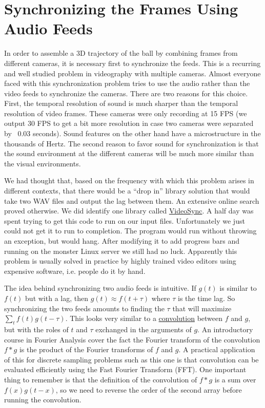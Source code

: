 \documentclass{article}
\begin{document}
\section{Synchronizing the Frames Using Audio Feeds}
In order to assemble a 3D trajectory of the ball by combining frames from different cameras,
it is necessary first to synchronize the feeds.  
This is a recurring and well studied problem in videography with multiple cameras.
Almost everyone faced with this synchronization problem tries to use the audio 
rather than the video feeds to synchronize the cameras.  There are two reasons for this choice.
First, the temporal resolution of sound is much sharper than the temporal resolution of video frames.
These cameras were only recording at 15 FPS 
(we output 30 FPS to get a bit more resolution in case two cameras were separated by ~0.03 seconds).
Sound features on the other hand have a microstructure in the thousands of Hertz.
The second reason to favor sound for synchronization is that the sound environment at the
different cameras will be much more similar than the visual environments.

We had thought that, based on the frequency with which this problem arises in different contexts,
that there would be a ``drop in'' library solution that would take two WAV files and output the lag
between them.  An extensive online search proved otherwise.  
We did identify one library called \href{https://github.com/allisonnicoledeal/VideoSync}{VideoSync}.
A half day was spent trying to get this code to run on our input files.
Unfortunately we just could not get it to run to completion.  
The program would run without throwing an exception, but would hang.
After modifying it to add progress bars and running on the monster Linux server we still had no luck.
Apparently this problem is usually solved in practice by highly trained video editors 
using expensive software, i.e. people do it by hand.

The idea behind synchronizing two audio feeds is intuitive.
If $g(t)$ is similar to $f(t)$ but with a lag, then $g(t) \approx f(t + \tau)$
where $\tau$ is the time lag.  So synchronizing the two feeds amounts to finding the $\tau$ that 
will maximize $\sum_t f(t) g(t - \tau)$.  This looks very similar to a 
\href{https://en.wikipedia.org/wiki/Convolution}{convolution} between $f$ and $g$,
but with the roles of $t$ and $\tau$ exchanged in the arguments of $g$.
An introductory course in Fourier Analysis cover the fact the Fourier transform of the convolution
$f * g$ is the product of the Fourier transforms of $f$ and $g$.
A practical application of this for discrete sampling problems such as this one is that convolution
can be evaluated efficiently using the Fast Fourier Transform (FFT).
One important thing to remember is that the definition of the convolution of $f*g$ is a sum over
$f(x) g(t-x)$, so we need to reverse the order of the second array before running the convolution.
\end{document}
